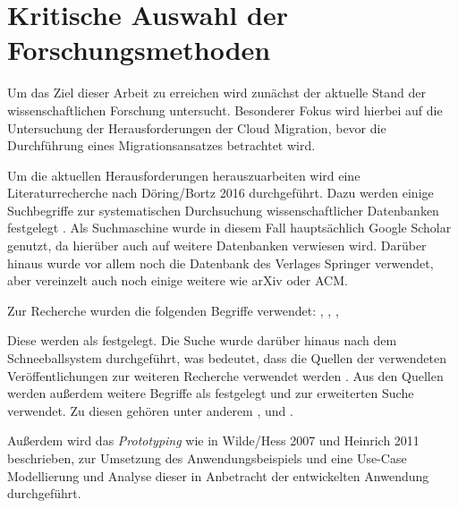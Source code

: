 \section{Kritische Auswahl der Forschungsmethoden}
\label{sec:auswahl_forschungsmethoden}


Um das Ziel dieser Arbeit zu erreichen wird zunächst der aktuelle Stand der wissenschaftlichen Forschung untersucht. Besonderer Fokus wird hierbei auf die Untersuchung der Herausforderungen der Cloud Migration, bevor die Durchführung eines Migrationsansatzes betrachtet wird.

Um die aktuellen Herausforderungen herauszuarbeiten wird eine Literaturrecherche nach Döring/Bortz 2016 durchgeführt. Dazu werden einige Suchbegriffe zur systematischen Durchsuchung wissenschaftlicher Datenbanken festgelegt \cite[Vgl.][S. 158]{Doering2016}. Als Suchmaschine wurde in diesem Fall hauptsächlich Google Scholar genutzt, da hierüber auch auf weitere Datenbanken verwiesen wird. Darüber hinaus wurde vor allem noch die Datenbank des Verlages Springer verwendet, aber vereinzelt auch noch einige weitere wie arXiv oder ACM.

Zur Recherche wurden die folgenden Begriffe verwendet: \grqq{}, \grqq{}, \grqq{}, \grqq{}

Diese werden als \textbf{\grqq{}} \cite[S. 158]{Doering2016} festgelegt. Die Suche wurde darüber hinaus nach dem Schneeballsystem durchgeführt, was bedeutet, dass die Quellen der verwendeten Veröffentlichungen zur weiteren Recherche verwendet werden \cite[Vgl.][S. 160]{Doering2016}. Aus den Quellen werden außerdem weitere Begriffe als \textbf{\grqq{}} \cite[S. 158]{Doering2016} festgelegt und zur erweiterten Suche verwendet. Zu diesen gehören unter anderem \grqq, \grqq{} und \grqq{}.

Außerdem wird das \textit{Prototyping} wie in Wilde/Hess 2007 und Heinrich 2011 beschrieben, zur Umsetzung des Anwendungsbeispiels und eine Use-Case Modellierung und Analyse dieser in Anbetracht der entwickelten Anwendung durchgeführt.
